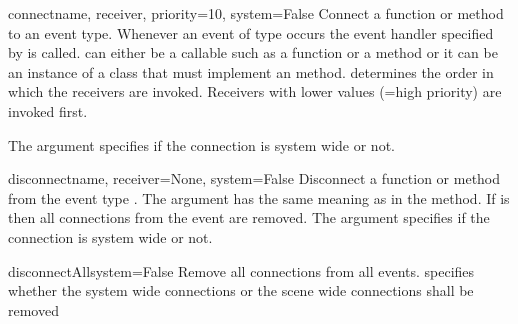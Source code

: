 \begin{methoddesc}{connect}{name, receiver, priority=10, system=False}
Connect a function or method to an event type. Whenever an event of type
 occurs the event handler specified by  is called.
 can either be a callable such as a function or a method
or it can be an instance of a class that must implement an 
 method.  determines the order in 
which the receivers are invoked. Receivers with lower values (=high priority)
are invoked first.

The argument  specifies if the connection is system wide or not.
\end{methoddesc}

\begin{methoddesc}{disconnect}{name, receiver=None, system=False}
Disconnect a function or method from the event type . The argument
 has the same meaning as in the  method.
If  is  then all connections from the event
are removed. The argument  specifies if the connection is
system wide or not.
\end{methoddesc}

\begin{methoddesc}{disconnectAll}{system=False}
Remove all connections from all events.  specifies whether the
system wide connections or the scene wide connections shall be removed
\end{methoddesc}


